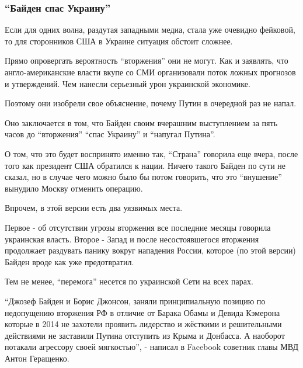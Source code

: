  
 
 
 
 

\subsubsection{\enquote{Байден спас Украину}}

Если для одних волна, раздутая западными медиа, стала уже очевидно фейковой, то
для сторонников США в Украине ситуация обстоит сложнее. 

Прямо опровергать вероятность \enquote{вторжения} они не могут. Как и заявлять,
что англо-американские власти вкупе со СМИ организовали поток ложных прогнозов
и утверждений. Чем нанесли серьезный урон украинской экономике. 

Поэтому они изобрели свое объяснение, почему Путин в очередной раз не напал.

Оно заключается в том, что Байден своим вчерашним выступлением за пять часов до
\enquote{вторжения} \enquote{спас Украину} и \enquote{напугал Путина}. 

О том, что это будет воспринято именно так, \enquote{Страна} говорила еще
вчера, после того как президент США обратился к нации. Ничего такого Байден по
сути не сказал, но в случае чего можно было бы потом говорить, что это
\enquote{внушение} вынудило Москву отменить операцию. 

Впрочем, в этой версии есть два уязвимых места.

Первое - об отсутствии угрозы вторжения все последние месяцы говорила
украинская власть. Второе - Запад и после несостоявшегося вторжения продолжает
раздувать панику вокруг нападения России, которое (по этой версии) Байден вроде
как уже предотвратил.

Тем не менее, \enquote{перемога} несется по украинской Сети на всех парах. 

\enquote{Джозеф Байден и Борис Джонсон, заняли принципиальную позицию по
недопущению вторжения РФ в отличие от Барака Обамы и Девида Кэмерона которые в
2014 не захотели проявить лидерство и жёсткими и решительными действиями не
заставили Путина отступить из Крыма и Донбасса. А наоборот потакали агрессору
своей мягкостью}, - написал в Facebook советник главы МВД Антон Геращенко.

